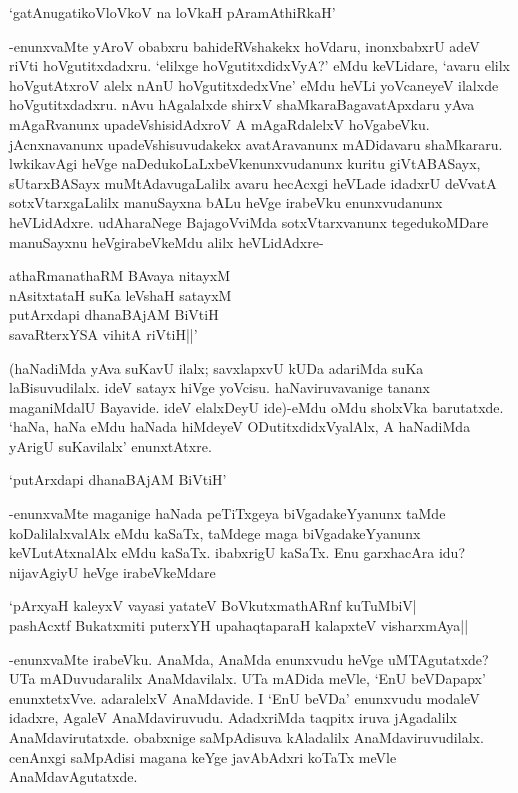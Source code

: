 \begin{shloka}
`gatAnugatikoVloVkoV na loVkaH pAramAthiRkaH'
\end{shloka} 

-enunxvaMte yAroV obabxru bahideRVshakekx hoVdaru, inonxbabxrU adeV riVti hoVgutitxdadxru. `elilxge hoVgutitxdidxVyA?' eMdu keVLidare, `avaru elilx hoVgutAtxroV alelx nAnU hoVgutitxdedxVne' eMdu heVLi yoVcaneyeV ilalxde hoVgutitxdadxru. nAvu hAgalalxde shirxV shaMkaraBagavatApxdaru yAva mAgaRvanunx upadeVshisidAdxroV A mAgaRdalelxV hoVgabeVku. jAcnxnavanunx upadeVshisuvudakekx avatAravanunx mADidavaru shaMkararu. lwkikavAgi heVge naDedukoLaLxbeVkenunxvudanunx kuritu giVtABASayx, sUtarxBASayx muMtAdavugaLalilx avaru hecAcxgi heVLade idadxrU deVvatA sotxVtarxgaLalilx manuSayxna bALu heVge irabeVku enunxvudanunx heVLidAdxre. udAharaNege BajagoVviMda sotxVtarxvanunx tegedukoMDare manuSayxnu heVgirabeVkeMdu alilx heVLidAdxre-

\begin{shloka}
athaRmanathaRM BAvaya nitayxM\\
nAsitxtataH suKa leVshaH satayxM\\
putArxdapi dhanaBAjAM BiVtiH\\
savaRterxYSA vihitA riVtiH||'
\end{shloka} 

(haNadiMda yAva suKavU ilalx; savxlapxvU kUDa adariMda suKa laBisuvudilalx. ideV satayx hiVge yoVcisu. haNaviruvavanige tananx maganiMdalU Bayavide. ideV elalxDeyU ide)-eMdu oMdu sholxVka barutatxde. `haNa, haNa eMdu haNada hiMdeyeV ODutitxdidxVyalAlx, A haNadiMda yArigU suKavilalx' enunxtAtxre.

\begin{shloka}
`putArxdapi dhanaBAjAM BiVtiH'
\end{shloka}

-enunxvaMte maganige haNada peTiTxgeya biVgadakeYyanunx taMde koDalilalxvalAlx eMdu kaSaTx, taMdege maga biVgadakeYyanunx keVLutAtxnalAlx eMdu kaSaTx. ibabxrigU kaSaTx. Enu garxhacAra idu? nijavAgiyU heVge irabeVkeMdare

\begin{shloka}
`pArxyaH kaleyxV vayasi yatateV BoVkutxmathARnf kuTuMbiV|\\
pashAcxtf Bukatxmiti puterxYH upahaqtaparaH kalapxteV visharxmAya|| 
\end{shloka}

-enunxvaMte irabeVku. AnaMda, AnaMda enunxvudu heVge uMTAgutatxde? UTa mADuvudaralilx AnaMdavilalx. UTa mADida meVle, `EnU beVDapapx' enunxtetxVve. adaralelxV AnaMdavide. I `EnU beVDa' enunxvudu modaleV idadxre, AgaleV AnaMdaviruvudu. AdadxriMda taqpitx iruva jAgadalilx AnaMdavirutatxde. obabxnige saMpAdisuva kAladalilx AnaMdaviruvudilalx. cenAnxgi saMpAdisi magana keYge javAbAdxri koTaTx meVle AnaMdavAgutatxde.

